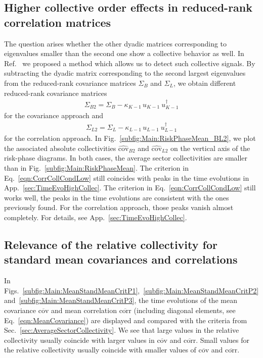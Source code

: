 \documentclass[aps, pra, groupedaddress, showkeys, twocolumn, floatfix, 10pt]{revtex4-2}
\newcommand*\mean[1]{\overline{#1}}
\newcommand*\meanNONDiag[1]{\widehat{#1}}
\begin{document}
\subsection{\label{sec:HigherOrderEffects}Higher collective order effects in reduced-rank correlation matrices}

The question arises whether the other dyadic matrices corresponding to eigenvalues smaller than the second one show a collective behavior as well. In Ref.~\cite{Heckens_2020} we proposed a method which allows us to detect such collective signals.
By subtracting the dyadic matrix corresponding to the second largest eigenvalues from the reduced-rank covariance matrices $\Sigma_B$ and $\Sigma_L$, we obtain different reduced-rank covariance matrices
%
\begin{align} \label{eqn:CovarianceMatSpectralDecomp_2}
	\Sigma_{B2}  = \Sigma_{B} - \kappa_{K-1} \, u_{K-1} \ u^{\dagger}_{K-1} %
\end{align}
%
for the covariance approach and
%
\begin{align} \label{eqn:CorrelationMatSpectralDecomp_2}
	\Sigma_{L2}  = \Sigma_{L} - \kappa_{L-1} \, u_{L-1} \ u^{\dagger}_{L-1} %
\end{align}
%
for the correlation approach.
In Fig.~\ref{subfig:Main:RiskPhaseMean_BL2}, we plot the associated absolute collectivities $\meanNONDiag{\text{cov}}_{B2}$ and $\meanNONDiag{\text{cov}}_{L2}$ on the vertical axis of the risk-phase diagrams.
In both cases, the average sector collectivities are smaller than in Fig.~\ref{subfig:Main:RiskPhaseMean}. The criterion in Eq.~\eqref{eqn:CorrCollCondLow} still coincides with peaks in the time evolutions in App.~\ref{sec:TimeEvoHighCollec}. 
The criterion in Eq.~\eqref{eqn:CorrCollCondLow} still works well, the peaks in the time evolutions are consistent with the ones previously found. For the correlation approach, those peaks vanish almost completely. For details, see App.~\ref{sec:TimeEvoHighCollec}. 



\subsection{\label{sec:RelevanceRelCollec}Relevance of the relative collectivity for
standard mean covariances and correlations}



In Figs.~\ref{subfig:Main:MeanStandMeanCritP1},~\ref{subfig:Main:MeanStandMeanCritP2} and~\ref{subfig:Main:MeanStandMeanCritP3}, the time evolutions of the mean covariance $\mean{\text{cov}}$ and mean correlation $\mean{\text{corr}}$ (including diagonal elements, see Eq.~\eqref{eqn:MeanCovariance}) are displayed and compared with the criteria from Sec.~\ref{sec:AverageSectorCollectivity}.
We see that large values in the relative collectivity usually coincide with larger values in 
$\mean{\text{cov}}$ and $\mean{\text{corr}}$. Small values for the relative collectivity usually coincide with smaller values of $\mean{\text{cov}}$ and $\mean{\text{corr}}$.
\end{document}
